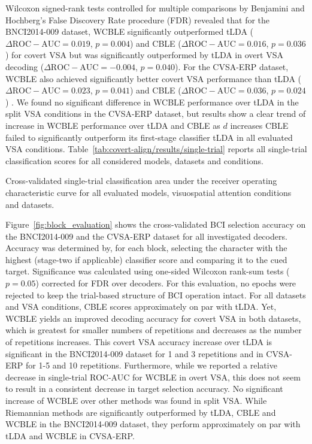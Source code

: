 Wilcoxon signed-rank tests controlled for multiple comparisons by Benjamini
and Hochberg's False Discovery Rate procedure (FDR) revealed that
for the BNCI2014-009 dataset, WCBLE significantly outperformed tLDA
($\Delta\mathrm{ROC-AUC} = 0.019$, $p=0.004$) and CBLE
($\Delta\mathrm{ROC-AUC} = 0.016$, $p=0.036$) for covert VSA
but was significantly outperformed by tLDA in overt VSA decoding
($\Delta\mathrm{ROC-AUC}=-0.004$, $p=0.040$).
For the CVSA-ERP dataset, WCBLE
also achieved significantly better covert VSA performance than tLDA ($\Delta\mathrm{ROC-AUC}
	= 0.023$, $p=0.041$) and CBLE ($\Delta\mathrm{ROC-AUC}
	= 0.036$, $p=0.024$) .
We found no significant difference in WCBLE performance over tLDA in the split
VSA conditions in the CVSA-ERP dataset, but results show a clear trend of
increase in WCBLE performance over tLDA and CBLE as $d$ increases
CBLE failed to significantly outperform its first-stage classifier tLDA in all
evaluated VSA conditions.
Table~\ref{tab:covert-align/results/single-trial} reports all single-trial classification scores for all considered models, datasets
and conditions.

\begin{table}
  \centering
  \makebox[\textwidth][c]{%
    
  }
  \caption{Cross-validated single-trial classification area under the receiver operating characteristic
curve for all evaluated models, visuospatial attention conditions and
  datasets.}
  \label{tab:covert-align/results/single-trial}
\end{table}


Figure~\ref{fig:block_evaluation} shows the cross-validated BCI selection
accuracy on the BNCI2014-009 and the CVSA-ERP dataset for all investigated
decoders.
Accuracy was determined by, for each block, selecting the character with the
highest (stage-two if applicable) classifier score and comparing it to the cued target.
Significance was calculated using one-sided Wilcoxon rank-sum tests ($p=0.05$)
corrected for FDR over decoders.
For this evaluation, no epochs were rejected to keep the trial-based structure of BCI
operation intact.
For all datasets and VSA conditions, CBLE scores approximately on par with tLDA.
Yet, WCBLE yields an improved decoding accuracy for covert VSA in both
datasets, which is greatest for smaller numbers of repetitions and
decreases as the number of repetitions increases.
This covert VSA accuracy increase over tLDA is significant in the BNCI2014-009 dataset
for 1 and 3 repetitions and in CVSA-ERP for 1-5 and 10 repetitions.
Furthermore, while we reported a relative decrease in single-trial ROC-AUC for
WCBLE in overt VSA, this does not seem to result in a consistent decrease in target
selection accuracy.
No significant increase of WCBLE over other methods was found in split VSA.
While Riemannian methods are significantly outperformed by tLDA, CBLE and WCBLE
in the BNCI2014-009 dataset, they perform approximately on par with tLDA and
WCBLE in CVSA-ERP.

